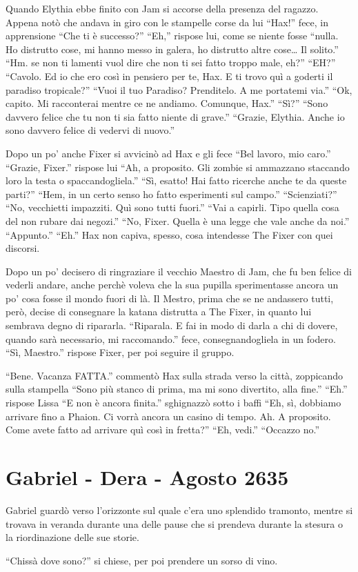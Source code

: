     Quando Elythia ebbe finito con Jam si accorse della presenza del
    ragazzo. Appena notò che andava in giro con le stampelle corse da lui
    ``Hax!'' fece, in apprensione ``Che ti è successo?'' ``Eh,'' rispose
    lui, come se niente fosse ``nulla. Ho distrutto cose, mi hanno messo in
    galera, ho distrutto altre cose\dots{} Il solito.'' ``Hm. se non ti
    lamenti vuol dire che non ti sei fatto troppo male, eh?'' ``EH?''
    ``Cavolo. Ed io che ero così in pensiero per te, Hax. E ti trovo quì a
    goderti il paradiso tropicale?'' ``Vuoi il tuo Paradiso? Prenditelo. A
    me portatemi via.'' ``Ok, capito. Mi racconterai mentre ce ne andiamo.
    Comunque, Hax.'' ``Sì?'' ``Sono davvero felice che tu non ti sia fatto
    niente di grave.'' ``Grazie, Elythia. Anche io sono davvero felice di
    vedervi di nuovo.''

    Dopo un po' anche Fixer si avvicinò ad Hax e gli fece ``Bel lavoro, mio
    caro.'' ``Grazie, Fixer.'' rispose lui ``Ah, a proposito. Gli zombie
    si ammazzano staccando loro la testa o spaccandogliela.'' ``Sì, esatto!
    Hai fatto ricerche anche te da queste parti?'' ``Hem, in un certo senso
    ho fatto esperimenti sul campo.'' ``Scienziati?'' ``No, vecchietti
    impazziti. Quì sono tutti fuori.'' ``Vai a capirli. Tipo quella cosa
    del non rubare dai negozi.'' ``No, Fixer. Quella è una legge che vale
    anche da noi.'' ``Appunto.'' ``Eh.'' Hax non capiva, spesso, cosa
    intendesse The Fixer con quei discorsi.

    Dopo un po' decisero di ringraziare il vecchio Maestro di Jam, che fu
    ben felice di vederli andare, anche perchè voleva che la sua pupilla
    sperimentasse ancora un po' cosa fosse il mondo fuori di là. Il Mestro,
    prima che se ne andassero tutti, però, decise di consegnare la katana
    distrutta a The Fixer, in quanto lui sembrava degno di ripararla.
    ``Riparala. E fai in modo di darla a chi di dovere, quando sarà
    necessario, mi raccomando.'' fece, consegnandogliela in un fodero.
    ``Sì, Maestro.'' rispose Fixer, per poi seguire il gruppo.

    ``Bene. Vacanza FATTA.'' commentò Hax sulla strada verso la città,
    zoppicando sulla stampella ``Sono più stanco di prima, ma mi sono
    divertito, alla fine.'' ``Eh.'' rispose Lissa ``E non è ancora
    finita.'' sghignazzò sotto i baffi ``Eh, sì, dobbiamo arrivare fino a
    Phaion. Ci vorrà ancora un casino di tempo. Ah. A proposito. Come avete
    fatto ad arrivare quì così in fretta?'' ``Eh, vedi.'' ``Occazzo no.''

  \section{Gabriel - Dera - Agosto 2635}

    Gabriel guardò verso l'orizzonte sul quale c'era uno splendido
    tramonto, mentre si trovava in veranda durante una delle pause che si
    prendeva durante la stesura o la riordinazione delle sue storie.

    ``Chissà dove sono?'' si chiese, per poi prendere un sorso di vino.

\cleardoublepage{}
